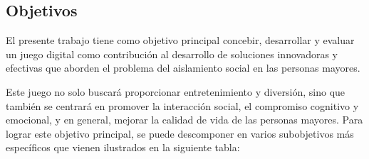 \subsection{Objetivos}
El presente trabajo tiene como objetivo principal concebir, desarrollar y evaluar un juego digital como contribución al desarrollo de soluciones innovadoras y efectivas que aborden el problema del aislamiento social en las personas mayores.

Este juego no solo buscará proporcionar entretenimiento y diversión, sino que también se centrará en promover la interacción social, el compromiso cognitivo y emocional, y en general, mejorar la calidad de vida de las personas mayores.
Para lograr este objetivo principal, se puede descomponer en varios subobjetivos más específicos que vienen ilustrados en la siguiente tabla:

